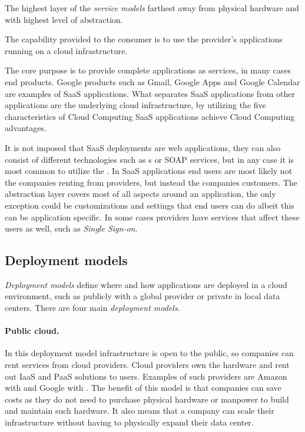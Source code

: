 The highest layer of the \emph{service models} farthest away from physical hardware
and with highest level of abstraction.
\epigraph{The capability provided to the consumer is to use the provider's 
  applications running on a cloud infrastructure.
}{\citet{nist:mell11}}

The core purpose is to provide complete applications as services, in many cases end products.
Google products such as Gmail, Google Apps and  Google Calendar are examples of 
SaaS applications.
What separates SaaS applications from other applications are the underlying cloud infrastructure,
by utilizing the five characteristics of Cloud Computing SaaS applications achieve 
Cloud Computing advantages.

It is not imposed that SaaS deployments are web applications, they can also consist of
different technologies such as  s or SOAP services, but in any case it is 
most common to utilize the .
In SaaS applications end users are most likely not the companies renting from providers, 
but instead the companies customers.
The abstraction layer covers most of all aspects around an application,
the only exception could be customizations and settings that end users can do albeit 
this can be application specific. In some cases providers have services that affect
these users as well, such as \emph{Single Sign-on}.

\subsection{Deployment models}

\emph{Deployment models} define where and how applications are deployed in a cloud environment,
such as publicly with a global provider or private in local data centers.
There are four main \emph{deployment models}.

\paragraph{Public cloud.}

In this deployment model infrastructure is open to the public,
so companies can rent services from cloud providers.
Cloud providers own the hardware and rent out IaaS and PaaS solutions to users.
Examples of such providers are Amazon with  and Google with .
The benefit of this model is that companies can save costs as 
they do not need to purchase physical hardware or manpower to build and maintain such hardware.
It also means that a company can scale their infrastructure without having to
physically expand their data center.

